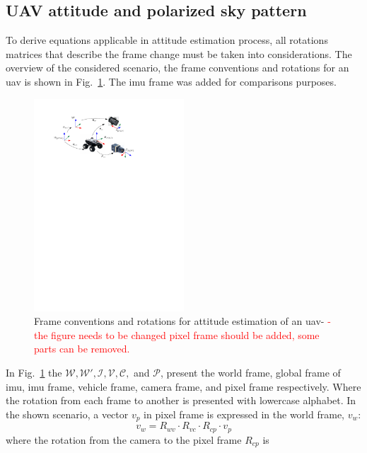 \subsection{UAV attitude and polarized sky pattern}
\label{subsec:ps-attitude}
To derive equations applicable in attitude estimation process, all rotations matrices that describe the frame change
must be taken into considerations. The overview of the considered scenario, the frame conventions and rotations
for an \gls{uav} is shown in Fig.~\ref{fig:rotation}. The \gls{imu} frame was added for comparisons purposes. 

\begin{figure}[h]
  \centering
  \includegraphics[width=0.5\textwidth]{./content/intro/figures/conventions.pdf}
  \caption{Frame conventions and rotations for attitude estimation of an
    \gls{uav}- \textcolor{red}{-the figure needs to be changed pixel frame
      should be added, some parts can be removed.}}
  \label{fig:rotation}
\end{figure}
In Fig.~\ref{fig:rotation} the $\mathcal{W}, \mathcal{W'}, \mathcal{I},
\mathcal{V}, \mathcal{C},$ and $\mathcal{P}$, present the world frame, global
frame of \gls{imu}, \gls{imu} frame, vehicle frame, camera frame, and pixel
frame respectively. Where the rotation from each frame to another is presented
with lowercase alphabet.
In the shown scenario, a vector $v_{p}$ in pixel frame is
expressed in the world frame, $v_{w}$:
\begin{equation}
  \label{eq:vinW}
  v_{w} = R_{wv} \cdot R_{vc} \cdot R_{cp} \cdot v_{p}
\end{equation}
\noindent where the rotation from the camera to the pixel frame $R_{cp}$ is

